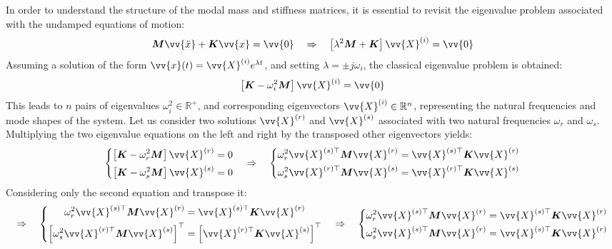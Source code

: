 In order to understand the structure of the modal mass and stiffness matrices, it is essential to revisit the eigenvalue problem associated with the undamped equations of motion:
\[
\boldsymbol{M} \vv{\ddot{x}} + \boldsymbol{K} \vv{x} = \vv{0}
\quad \Rightarrow \quad
\left[ \lambda^2 \boldsymbol{M} + \boldsymbol{K} \right] \vv{X}^{(i)} = \vv{0}
\]
Assuming a solution of the form \( \vv{x}(t) = \vv{X}^{(i)} e^{\lambda t} \), and setting \( \lambda = \pm j \omega_i \), the classical eigenvalue problem is obtained:
\[
\left[ \boldsymbol{K} - \omega_i^2 \boldsymbol{M} \right] \vv{X}^{(i)} = \vv{0}
\]
This leads to \( n \) pairs of eigenvalues \( \omega_i^2 \in \mathbb{R}^+ \), and corresponding eigenvectors \( \vv{X}^{(i)} \in \mathbb{R}^n \), representing the natural frequencies and mode shapes of the system. Let us consider two solutions \( \vv{X}^{(r)} \) and \( \vv{X}^{(s)} \) associated with two natural frequencies \( \omega_r \) and \( \omega_s \). Multiplying the two eigenvalue equations on the left and right by the transposed other eigenvectors yields:
\[
\left\{
\begin{aligned}
\left[\boldsymbol{K}-\omega_r^2 \boldsymbol{M} \right] \vv{X}^{(r)} &= 0 \\
\left[\boldsymbol{K}-\omega_s^2 \boldsymbol{M} \right] \vv{X}^{(s)} &= 0
\end{aligned}
\right.
\quad \Rightarrow \quad
\left\{
\begin{aligned}
\omega_r^2 \vv{X}^{(s)\top} \boldsymbol{M} \vv{X}^{(r)} &= \vv{X}^{(s)\top} \boldsymbol{K} \vv{X}^{(r)} \\
\omega_s^2 \vv{X}^{(r)\top} \boldsymbol{M} \vv{X}^{(s)} &= \vv{X}^{(r)\top} \boldsymbol{K} \vv{X}^{(s)}
\end{aligned}
\right.
\]
Considering only the second equation and transpose it:
\[
\Rightarrow \quad
\left\{
\begin{aligned}
\omega_r^2 \vv{X}^{(s)\top} \boldsymbol{M} \vv{X}^{(r)} &= \vv{X}^{(s)\top} \boldsymbol{K} \vv{X}^{(r)} \\
\left[ \omega_s^2 \vv{X}^{(r)\top} \boldsymbol{M} \vv{X}^{(s)} \right]^{\top} &= \left[ \vv{X}^{(r)\top} \boldsymbol{K} \vv{X}^{(s)} \right]^\top
\end{aligned}
\right.
\quad \Rightarrow \quad
\left\{
\begin{aligned}
\omega_r^2 \vv{X}^{(s)\top} \boldsymbol{M} \vv{X}^{(r)} &= \vv{X}^{(s)\top} \boldsymbol{K} \vv{X}^{(r)} \\
\omega_s^2 \vv{X}^{(s)\top} \boldsymbol{M} \vv{X}^{(r)} &= \vv{X}^{(s)\top} \boldsymbol{K} \vv{X}^{(r)}
\end{aligned}
\right.
\]
